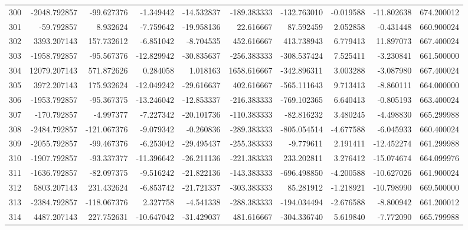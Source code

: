 \begin{tabular}{lrrrrrrrrr}
300 &  -2048.792857 &   -99.627376 &  -1.349442 & -14.532837 &  -189.383333 &  -132.763010 &  -0.019588 & -11.802638 &  674.200012 \\
301 &    -59.792857 &     8.932624 &  -7.759642 & -19.958136 &    22.616667 &    87.592459 &   2.052858 &  -0.431448 &  660.900024 \\
302 &   3393.207143 &   157.732612 &  -6.851042 &  -8.704535 &   452.616667 &   413.738943 &   6.779413 &  11.897073 &  667.400024 \\
303 &  -1958.792857 &   -95.567376 & -12.829942 & -30.835637 &  -256.383333 &  -308.537424 &   7.525411 &  -3.230841 &  661.500000 \\
304 &  12079.207143 &   571.872626 &   0.284058 &   1.018163 &  1658.616667 &  -342.896311 &   3.003288 &  -3.087980 &  667.400024 \\
305 &   3972.207143 &   175.932624 & -12.049242 & -29.616637 &   402.616667 &  -565.111643 &   9.713413 &  -8.860111 &  664.000000 \\
306 &  -1953.792857 &   -95.367375 & -13.246042 & -12.853337 &  -216.383333 &  -769.102365 &   6.640413 &  -0.805193 &  663.400024 \\
307 &   -170.792857 &    -4.997377 &  -7.227342 & -20.101736 &  -110.383333 &   -82.816232 &   3.480245 &  -4.498830 &  665.299988 \\
308 &  -2484.792857 &  -121.067376 &  -9.079342 &  -0.260836 &  -289.383333 &  -805.054514 &  -4.677588 &  -6.045933 &  660.400024 \\
309 &  -2055.792857 &   -99.467376 &  -6.253042 & -29.495437 &  -255.383333 &    -9.779611 &   2.191411 & -12.452274 &  661.299988 \\
310 &  -1907.792857 &   -93.337377 & -11.396642 & -26.211136 &  -221.383333 &   233.202811 &   3.276412 & -15.074674 &  664.099976 \\
311 &  -1636.792857 &   -82.097375 &  -9.516242 & -21.822136 &  -143.383333 &  -696.498850 &  -4.200588 & -10.627026 &  661.900024 \\
312 &   5803.207143 &   231.432624 &  -6.853742 & -21.721337 &  -303.383333 &    85.281912 &  -1.218921 & -10.798990 &  669.500000 \\
313 &  -2384.792857 &  -118.067376 &   2.327758 &  -4.541338 &  -288.383333 &  -194.034494 &  -2.676588 &  -8.800942 &  661.200012 \\
314 &   4487.207143 &   227.752631 & -10.647042 & -31.429037 &   481.616667 &  -304.336740 &   5.619840 &  -7.772090 &  665.799988 \\

\end{tabular}
